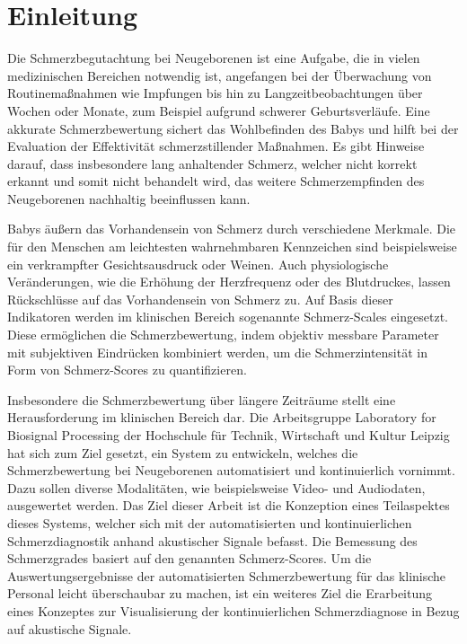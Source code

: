 \chapter{Einleitung}

Die Schmerzbegutachtung bei Neugeborenen ist eine Aufgabe, die in vielen medizinischen Bereichen notwendig ist, angefangen bei der Überwachung von Routinemaßnahmen wie Impfungen bis hin zu Langzeitbeobachtungen über Wochen oder Monate, zum Beispiel aufgrund schwerer Geburtsverläufe. Eine akkurate Schmerzbewertung sichert das Wohlbefinden des Babys und hilft bei der Evaluation der Effektivität schmerzstillender Maßnahmen. Es gibt Hinweise darauf, dass insbesondere lang anhaltender Schmerz, welcher nicht korrekt erkannt und somit nicht behandelt wird, das weitere Schmerzempfinden des Neugeborenen nachhaltig beeinflussen kann.\cite[S. 402 - 403]{PainAssessment03} \cite[S. 439]{PainAssessment01}

Babys äußern das Vorhandensein von Schmerz durch verschiedene Merkmale. Die für den Menschen am leichtesten wahrnehmbaren Kennzeichen sind beispielsweise ein verkrampfter Gesichtsausdruck oder Weinen. Auch physiologische Veränderungen, wie die Erhöhung der Herzfrequenz oder des Blutdruckes, lassen Rückschlüsse auf das Vorhandensein von Schmerz zu.\cite[S. 440]{PainAssessment01} Auf Basis dieser Indikatoren werden im klinischen Bereich sogenannte Schmerz-Scales eingesetzt. Diese ermöglichen die Schmerzbewertung, indem objektiv messbare Parameter mit subjektiven Eindrücken kombiniert werden, um die Schmerzintensität in Form von Schmerz-Scores zu quantifizieren.\cite[S. 100 - 101]{painInNeonates}


Insbesondere die Schmerzbewertung über längere Zeiträume stellt eine Herausforderung im klinischen Bereich dar.\cite[S. 240]{painAssessmentStatus} Die Arbeitsgruppe \glqq Laboratory for Biosignal Processing\grqq{} der Hochschule für Technik, Wirtschaft und Kultur Leipzig hat sich zum Ziel gesetzt, ein System zu entwickeln, welches die Schmerzbewertung bei Neugeborenen automatisiert und kontinuierlich vornimmt. Dazu sollen diverse Modalitäten, wie beispielsweise Video- und Audiodaten, ausgewertet werden. Das Ziel dieser Arbeit ist die Konzeption eines Teilaspektes dieses Systems, welcher sich mit der automatisierten und kontinuierlichen Schmerzdiagnostik anhand akustischer Signale befasst. Die Bemessung des Schmerzgrades basiert auf den genannten Schmerz-Scores. Um die Auswertungsergebnisse der automatisierten Schmerzbewertung für das klinische Personal leicht überschaubar zu machen, ist ein weiteres Ziel die Erarbeitung eines Konzeptes zur Visualisierung der kontinuierlichen Schmerzdiagnose in Bezug auf akustische Signale.


